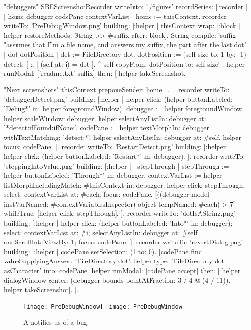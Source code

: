 \documentclass[a4paper,10pt,twoside]{book}
\begin{document}
\begin{ExecuteSmalltalkScript}
"debuggers"
SBEScreenshotRecorder writeInto: './figures' recordSeries: [:recorder |
	| home debugger codePane contextVarList |
	home := thisContext.
	recorder writeTo: 'PreDebugWindow.png' building: [:helper |
		thisContext wrap: [:block | helper restoreMethods: {String >> #suffix} after: block].
		String compile: 'suffix
	"assumes that I''m a file name, and answers my suffix, the part after the last dot"
	| dot dotPosition |
	dot := FileDirectory dot.
	dotPosition := (self size to: 1 by: -1) detect: [ :i | (self at: i) = dot ].
	^ self copyFrom: dotPosition to: self size'
.
		helper
			runModal: ['readme.txt' suffix]
			then: [
				helper takeScreenshot.

				"Next screenshots"
				thisContext preponeSender: home.
			].
	].
	recorder writeTo: 'debuggerDetect.png' building: [:helper |
		helper click: (helper buttonLabeled: 'Debug*' in: helper foregroundWindow).
		debugger := helper foregroundWindow.
		helper scaleWindow: debugger.
		helper selectAnyListIn: debugger at: '*detect:ifFound:ifNone:'.
		codePane := helper textMorphIn: debugger withTextMatching: 'detect:*'.
		helper selectAnyListIn: debugger at: #self.
		helper focus: codePane.
	].
	recorder writeTo: 'RestartDetect.png' building: [:helper |
		helper click: (helper buttonLabeled: 'Restart*' in: debugger).
	].
	recorder writeTo: 'steppingIntoValue.png' building: [:helper |
		| stepThrough |
		stepThrough := helper buttonLabeled: 'Through*' in: debugger.
		contextVarList := helper listMorphIncludingMatch: #thisContext in: debugger.
		helper
			click: stepThrough;
			select: contextVarList at: #each;
			focus: codePane.
		[((debugger model instVarNamed: #contextVariablesInspector) object tempNamed: #each) > 7]
			whileTrue: [helper click: stepThrough].
	].
	recorder writeTo: 'dotIsAString.png' building: [:helper |
		helper
			click: (helper buttonLabeled: 'Into*' in: debugger);
			select: contextVarList at: #i;
			selectAnyListIn: debugger at: #self andScrollIntoViewBy: 1;
			focus: codePane.
	].
	recorder writeTo: 'revertDialog.png' building: [:helper |
		codePane setSelection: (1 to: 0).
		[codePane find]
			valueSupplyingAnswer: 'FileDirectory dot'.
		helper type: 'FileDirectory dot asCharacter' into: codePane.
		helper
			runModal: [codePane accept]
			then: [
				helper dialogWindow center: (debugger bounds pointAtFraction: 3 / 4 @ (4 / 11)).
				helper takeScreenshot].
	].
]
\end{ExecuteSmalltalkScript}
\begin{figure}[btp]
	\begin{center}
	\ifluluelse
		{\texttt{[image: PreDebugWindow]}}
		{\texttt{[image: PreDebugWindow]}}
	\end{center}
	\caption{A  notifies us of a bug.}
	\label{fig:PreDebugWindow}
\end{figure}
\end{document}
